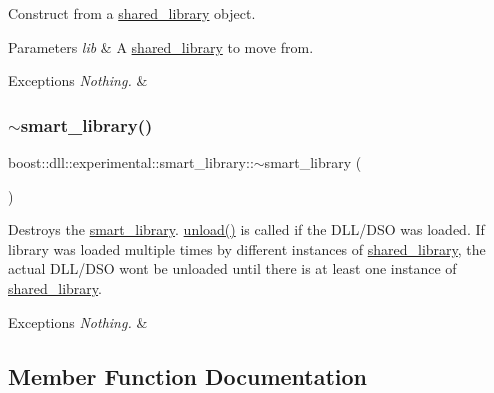 Construct from a \hyperlink{a01708}{shared\+\_\+library} object.


\begin{DoxyParams}{Parameters}
{\em lib} & A \hyperlink{a01708}{shared\+\_\+library} to move from.\\
\hline
\end{DoxyParams}

\begin{DoxyExceptions}{Exceptions}
{\em Nothing.} & \\
\hline
\end{DoxyExceptions}
\mbox{\label{a01712_ae832b6930c08e751321df14ad7a9a190}} 
\subsubsection{\texorpdfstring{$\sim$smart\+\_\+library()}{~smart\_library()}}
{\footnotesize\ttfamily boost\+::dll\+::experimental\+::smart\+\_\+library\+::$\sim$smart\+\_\+library (\begin{DoxyParamCaption}{ }\end{DoxyParamCaption})\hspace{0.3cm}{\ttfamily [inline]}}

Destroys the \hyperlink{a01712}{smart\+\_\+library}. {\ttfamily \hyperlink{a01712_a2b96d7817794a2adabe1f7bb22be5483}{unload()}} is called if the D\+L\+L/\+D\+SO was loaded. If library was loaded multiple times by different instances of \hyperlink{a01708}{shared\+\_\+library}, the actual D\+L\+L/\+D\+SO won\textquotesingle{}t be unloaded until there is at least one instance of \hyperlink{a01708}{shared\+\_\+library}.


\begin{DoxyExceptions}{Exceptions}
{\em Nothing.} & \\
\hline
\end{DoxyExceptions}


\subsection{Member Function Documentation}
\mbox{\label{a01712_aa19292156eb6497e10f108fb614d9939}} 

